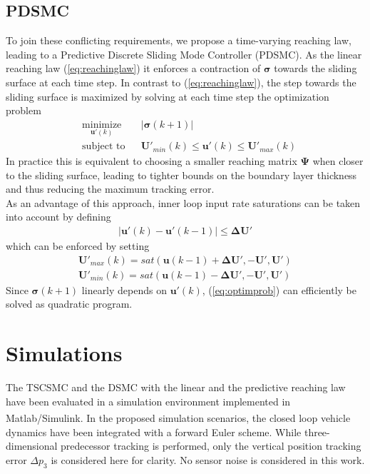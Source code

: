 \documentclass{ifacconf}
\providecommand{\mbf}[1]{\mathbf{#1}}
\newcommand{\idxSample}{{\ensuremath{k}}}
\begin{document}
\subsection{PDSMC}
To join these conflicting requirements, we propose a time-varying reaching law, leading to a Predictive Discrete Sliding Mode Controller (PDSMC). As the linear reaching law (\ref{eq:reachinglaw}) it enforces a contraction of $\mbf{\sigma}$ towards the sliding surface at each time step. In contrast to (\ref{eq:reachinglaw}), the step towards the sliding surface is maximized by solving at each time step the optimization problem
\begin{align}
& \underset{\mbf{u'}(\idxSample)}{\text{minimize}}
& & |\mbf{\sigma}(\idxSample+1)| 
\label{eq:optimprob} \\
& \text{subject to}
& & \mbf{U}'_{min}(\idxSample) \leq \mbf{u'}(\idxSample) \leq \mbf{U}'_{max}(\idxSample) 
\end{align}
In practice this is equivalent to choosing a smaller reaching matrix $\mbf{\Psi}$ when closer to the sliding surface, leading to tighter bounds on the boundary layer thickness and thus reducing the maximum tracking error.\\
As an advantage of this approach, inner loop input rate saturations can be taken into account by defining 
\begin{align}
|\mbf{u'}(\idxSample) - \mbf{u'}(\idxSample-1)| \leq \mbf{\Delta U}'
\end{align}
which can be enforced by setting
\begin{align}
\mbf{U}'_{max}(\idxSample) = sat(\mbf{u}(\idxSample-1) + \mbf{\Delta U}', -\mbf{U}', \mbf{U}') \\
\mbf{U}'_{min}(\idxSample) = sat(\mbf{u}(\idxSample-1) - \mbf{\Delta U}', -\mbf{U}', \mbf{U}') 
\end{align}
Since $\mbf{\sigma}(\idxSample + 1)$ linearly depends on $\mbf{u}'(\idxSample)$, (\ref{eq:optimprob}) can efficiently be solved as quadratic program.
\section{Simulations}
\label{sec:simulations}
The TSCSMC and the DSMC with the linear and the predictive reaching law have been evaluated in a simulation environment implemented in Matlab\textsuperscript{\tiny \textregistered}/Simulink\textsuperscript{\tiny \textregistered}. In the proposed simulation scenarios, the closed loop vehicle dynamics have been integrated with a forward Euler scheme. While three-dimensional predecessor tracking is performed, only the vertical position tracking error $\Delta p_3$ is considered here for clarity. No sensor noise is considered in this work.
\end{document}
